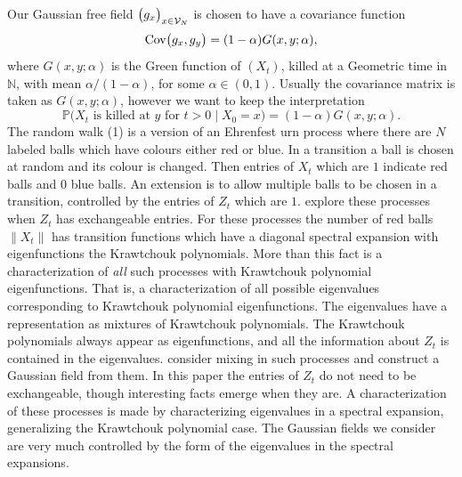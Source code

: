 \documentclass[preprint,11pt]{elsarticle}
\theoremstyle{remark}
\begin{document}
Our Gaussian free field $\big (g_x\big )_{x\in {\cal V}_N}$ is chosen to have a covariance function
\begin{equation*}
\text{\rm Cov}\big (g_x,g_y\big ) = (1-\alpha)G(x,y;\alpha),
\label {covdefn:00}
\end{equation*}
where $G(x,y;\alpha)$ is the Green function of $(X_t)$, killed at a Geometric time in $\mathbb{N}$, with mean  $\alpha/(1-\alpha)$, for some $\alpha \in (0,1)$.
Usually the covariance matrix is taken as $G(x,y;\alpha)$, however we want to keep the interpretation%
\[
\mathbb{P}\big (X_t\text{~is~killed~at~}y\text{~for~}t > 0\mid X_0=x\big )
= (1-\alpha)G(x,y;\alpha).
\]
The random walk (1) is a version of an Ehrenfest urn process where there are $N$ labeled balls which have colours either red or blue. In a transition a ball is chosen at random and its colour is changed. Then entries of $X_t$ which are $1$ indicate red balls and $0$ blue balls.
An extension is to allow multiple balls to be chosen in a transition, controlled by the entries of $Z_t$ which are $1$. \cite{DG2012} explore these processes when $Z_t$ has exchangeable 
entries. For these processes the number of red balls $\|X_t\|$ has transition functions which have a diagonal spectral expansion with eigenfunctions the Krawtchouk polynomials.
More than this fact is a characterization of \emph{all} such processes with Krawtchouk polynomial eigenfunctions. That is, a characterization of all possible eigenvalues corresponding to
Krawtchouk polynomial eigenfunctions. The eigenvalues have a representation as mixtures of Krawtchouk polynomials. The Krawtchouk polynomials always appear as eigenfunctions, and all the information about $Z_t$ is contained in the eigenvalues. \cite{CG2021} consider mixing in such processes and \cite{CG2025} construct a Gaussian field from them. In this paper the entries of $Z_t$ do not need to be exchangeable, though interesting facts emerge when they are. A characterization of these processes is made by characterizing eigenvalues in a spectral expansion, generalizing the Krawtchouk polynomial case. The Gaussian fields we consider are very much controlled by the form of the eigenvalues in the spectral expansions.






\end{document}
